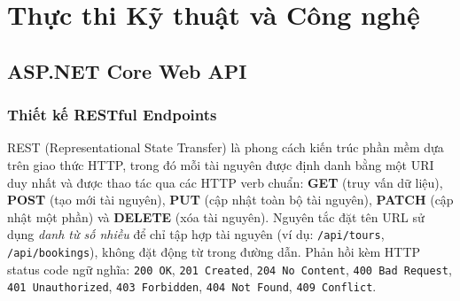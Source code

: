 
\chapter{Thực thi Kỹ thuật và Công nghệ}

\section{ASP.NET Core Web API}\label{Sec4.1}

\subsection{Thiết kế RESTful Endpoints}\label{sub4.1.1}

\begin{de}\label{def4.1}
  REST (Representational State Transfer) là phong cách kiến trúc phần mềm
  dựa trên giao thức HTTP, trong đó mỗi tài nguyên được định danh bằng một URI
  duy nhất và được thao tác qua các HTTP verb chuẩn:
  \textbf{GET} (truy vấn dữ liệu),
  \textbf{POST} (tạo mới tài nguyên),
  \textbf{PUT} (cập nhật toàn bộ tài nguyên),
  \textbf{PATCH} (cập nhật một phần) và
  \textbf{DELETE} (xóa tài nguyên).
  Nguyên tắc đặt tên URL sử dụng \emph{danh từ số nhiều} để chỉ tập hợp
  tài nguyên (ví dụ: \texttt{/api/tours}, \texttt{/api/bookings}),
  không đặt động từ trong đường dẫn.
  Phản hồi kèm HTTP status code ngữ nghĩa:
  \texttt{200 OK}, \texttt{201 Created}, \texttt{204 No Content},
  \texttt{400 Bad Request}, \texttt{401 Unauthorized},
  \texttt{403 Forbidden}, \texttt{404 Not Found}, \texttt{409 Conflict}.
\end{de}


